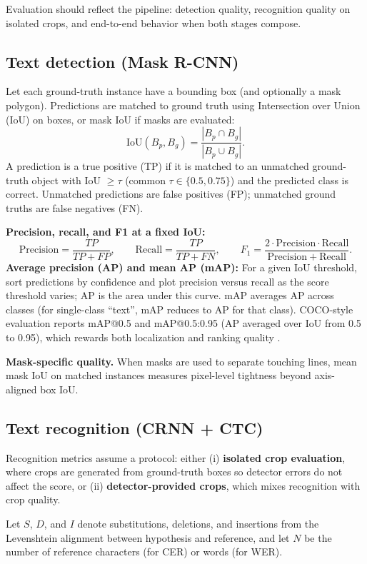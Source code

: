 \documentclass[11pt, a4paper]{article}
\begin{document}
Evaluation should reflect the pipeline: detection quality, recognition quality on isolated crops, and end-to-end behavior when both stages compose.

\subsection{Text detection (Mask R-CNN)}
Let each ground-truth instance have a bounding box (and optionally a mask polygon). Predictions are matched to ground truth using Intersection over Union (IoU) on boxes, or mask IoU if masks are evaluated:
\[
\mathrm{IoU}(B_p,B_g)=\frac{|B_p \cap B_g|}{|B_p \cup B_g|}.
\]
A prediction is a true positive (TP) if it is matched to an unmatched ground-truth object with IoU $\geq \tau$ (common $\tau \in \{0.5,0.75\}$) and the predicted class is correct. Unmatched predictions are false positives (FP); unmatched ground truths are false negatives (FN).

\textbf{Precision, recall, and F1 at a fixed IoU:}
\[
\mathrm{Precision}=\frac{TP}{TP+FP}, \qquad
\mathrm{Recall}=\frac{TP}{TP+FN}, \qquad
F_1 = \frac{2 \cdot \mathrm{Precision}\cdot \mathrm{Recall}}{\mathrm{Precision}+\mathrm{Recall}}.
\]
\textbf{Average precision (AP) and mean AP (mAP):} For a given IoU threshold, sort predictions by confidence and plot precision versus recall as the score threshold varies; AP is the area under this curve. mAP averages AP across classes (for single-class ``text'', mAP reduces to AP for that class). COCO-style evaluation reports mAP@0.5 and mAP@0.5:0.95 (AP averaged over IoU from 0.5 to 0.95), which rewards both localization and ranking quality \cite{he2017maskrcnn}.

\textbf{Mask-specific quality.} When masks are used to separate touching lines, mean mask IoU on matched instances measures pixel-level tightness beyond axis-aligned box IoU.

\subsection{Text recognition (CRNN + CTC)}
Recognition metrics assume a protocol: either (i) \textbf{isolated crop evaluation}, where crops are generated from ground-truth boxes so detector errors do not affect the score, or (ii) \textbf{detector-provided crops}, which mixes recognition with crop quality.

Let $S$, $D$, and $I$ denote substitutions, deletions, and insertions from the Levenshtein alignment between hypothesis and reference, and let $N$ be the number of reference characters (for CER) or words (for WER).
\end{document}
